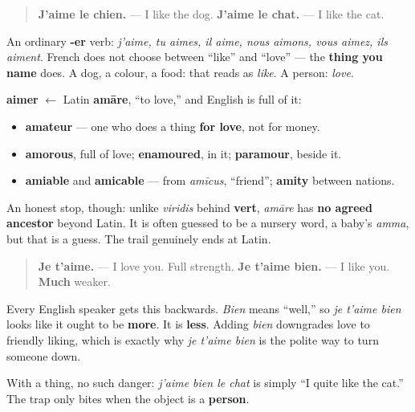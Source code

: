 \begin{quote}
\textbf{J'aime le chien.} — I like the dog. \textbf{J'aime le chat.} — I like the cat.
\end{quote}

An ordinary \textbf{-er} verb: \emph{j'aime, tu aimes, il aime, nous aimons, vous aimez, ils aiment}. French does not choose between \textquotedblleft{}like\textquotedblright{} and \textquotedblleft{}love\textquotedblright{} — the \textbf{thing you name} does. A dog, a colour, a food: that reads as \emph{like}. A person: \emph{love}.

\begin{cousinweb}
\textbf{aimer} $\leftarrow$ Latin \textbf{amāre}, \textquotedblleft{}to love,\textquotedblright{} and English is full of it:

\begin{itemize}
\raggedright
  \item \textbf{amateur} — one who does a thing \textbf{for love}, not for money.
  \item \textbf{amorous}, full of love; \textbf{enamoured}, in it; \textbf{paramour}, beside it.
  \item \textbf{amiable} and \textbf{amicable} — from \emph{amīcus}, \textquotedblleft{}friend\textquotedblright{}; \textbf{amity} between nations.
\end{itemize}

An honest stop, though: unlike \emph{viridis} behind \textbf{vert}, \emph{amāre} has \textbf{no agreed ancestor} beyond Latin. It is often guessed to be a nursery word, a baby's \emph{amma}, but that is a guess. The trail genuinely ends at Latin.
\end{cousinweb}

\begin{culture}
\begin{quote}
\textbf{Je t'aime.} — I love you. Full strength. \textbf{Je t'aime bien.} — I like you. \textbf{Much} weaker.
\end{quote}

Every English speaker gets this backwards. \emph{Bien} means \textquotedblleft{}well,\textquotedblright{} so \emph{je t'aime bien} looks like it ought to be \textbf{more}. It is \textbf{less}. Adding \emph{bien} downgrades love to friendly liking, which is exactly why \emph{je t'aime bien} is the polite way to turn someone down.

With a thing, no such danger: \emph{j'aime bien le chat} is simply \textquotedblleft{}I quite like the cat.\textquotedblright{} The trap only bites when the object is a \textbf{person}.
\end{culture}

